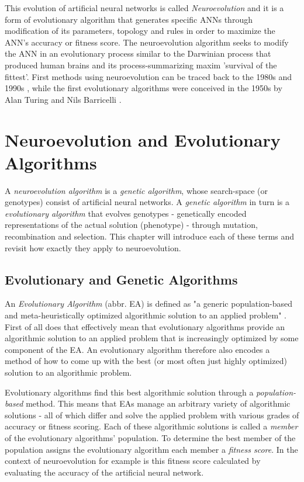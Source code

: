 \documentclass[journal, a4paper]{IEEEtran}
\begin{document}
This evolution of artificial neural networks is called \textit{Neuroevolution} and it is a form of evolutionary algorithm that generates specific ANNs through modification of its parameters, topology and rules in order to maximize the ANN's accuracy or fitness score. The neuroevolution algorithm seeks to modify the ANN in an evolutionary process similar to the Darwinian process that produced human brains and its process-summarizing maxim 'survival of the fittest'. First methods using neuroevolution can be traced back to the 1980s and 1990s \cite{fro18}, while the first evolutionary algorithms were conceived in the 1950s by Alan Turing and Nils Barricelli \cite{tur50}.




\section{Neuroevolution and Evolutionary Algorithms}

A \textit{neuroevolution algorithm} is a \textit{genetic algorithm}, whose search-space (or genotypes) consist of artificial neural networks. A \textit{genetic algorithm} in turn is a \textit{evolutionary algorithm} that evolves genotypes - genetically encoded representations of the actual solution (phenotype) - through mutation, recombination and selection. This chapter will introduce each of these terms and revisit how exactly they apply to neuroevolution.



\subsection{Evolutionary and Genetic Algorithms}

An \textit{Evolutionary Algorithm} (abbr. EA) is defined as "a generic population-based and meta-heuristically optimized algorithmic solution to an applied problem" \cite{hol12}. First of all does that effectively mean that evolutionary algorithms provide an algorithmic solution to an applied problem that is increasingly optimized by some component of the EA. An evolutionary algorithm therefore also encodes a method of how to come up with the best (or most often just highly optimized) solution to an algorithmic problem.

Evolutionary algorithms find this best algorithmic solution through a \textit{population-based} method. This means that EAs manage an arbitrary variety of algorithmic solutions - all of which differ and solve the applied problem with various grades of accuracy or fitness scoring. Each of these algorithmic solutions is called a \textit{member} of the evolutionary algorithms' population. To determine the best member of the population assigns the evolutionary algorithm each member a \textit{fitness score}. In the context of neuroevolution for example is this fitness score calculated by evaluating the accuracy of the artificial neural network.
\end{document}

